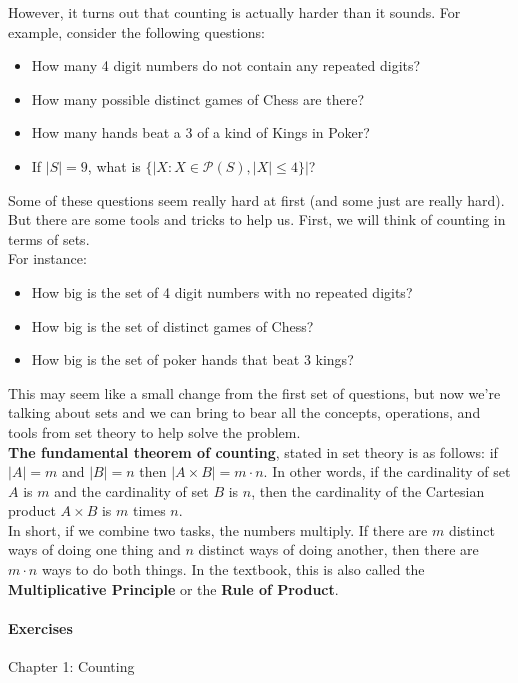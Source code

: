 \documentclass[11pt]{article} %
\begin{document}
	However, it turns out that counting is actually harder than it sounds. For example, consider the following questions:
	
	\begin{itemize}
		\item How many 4 digit numbers do not contain any repeated digits?
		\item How many possible distinct games of Chess are there?
		\item How many hands beat a 3 of a kind of Kings in Poker?
		\item If $|S| = 9$, what is $\{|X : X \in \mathcal{P}(S), |X| \leq 4\}|$?
	\end{itemize}

	Some of these questions seem really hard at first (and some just are really hard). But there are some tools and tricks to help us. First, we will think of counting in terms of sets. \\
	
	For instance:
	\begin{itemize}
		\item How big is the set of 4 digit numbers with no repeated digits?
		\item How big is the set of distinct games of Chess?
		\item How big is the set of poker hands that beat 3 kings?
	\end{itemize}

	This may seem like a small change from the first set of questions, but now we're talking about sets and we can bring to bear all the concepts, operations, and tools from set theory to help solve the problem.\\
	
	\textbf{The fundamental theorem of counting}, stated in set theory is as follows:
	if $|A| = m$ and $|B| = n$ then $|A \times B| = m \cdot n$. In other words, if the cardinality of set $A$ is $m$ and the cardinality of set $B$ is $n$, then the cardinality of the Cartesian product $A \times B$ is $m$ times $n$.\\ 
	
	In short, if we combine two tasks, the numbers multiply. If there are $m$ distinct ways of doing one thing and $n$ distinct ways of doing another, then there are $m \cdot n$ ways to do both things. In the textbook, this is also called the \textbf{Multiplicative Principle} or the \textbf{Rule of Product}.
	
	

	
	\paragraph{Exercises} Chapter 1: Counting\\
	
\end{document}
